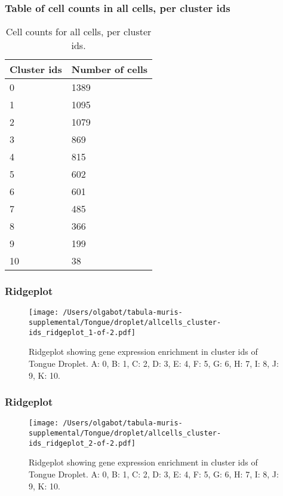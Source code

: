 \subsubsection{Table of cell counts in all cells, per cluster ids}\begin{table}[h]
\centering
\label{my-label}
\begin{tabular}{@{}ll@{}}
\toprule

Cluster ids& Number of cells \\ \midrule
0 & 1389 \\

1 & 1095 \\

2 & 1079 \\

3 & 869 \\

4 & 815 \\

5 & 602 \\

6 & 601 \\

7 & 485 \\

8 & 366 \\

9 & 199 \\

10 & 38 \\
\bottomrule
\end{tabular}
\caption{Cell counts for all cells, per cluster ids.}
\end{table}

\newpage
\subsubsection{Ridgeplot}
\begin{figure}[h]
\centering
\texttt{[image: /Users/olgabot/tabula-muris-supplemental/Tongue/droplet/allcells\_cluster-ids\_ridgeplot\_1-of-2.pdf]}

\caption{ Ridgeplot  showing gene expression enrichment in cluster ids of Tongue Droplet. A: 0, B: 1, C: 2, D: 3, E: 4, F: 5, G: 6, H: 7, I: 8, J: 9, K: 10.}
\end{figure}


\newpage
\newpage
\subsubsection{Ridgeplot}
\begin{figure}[h]
\centering
\texttt{[image: /Users/olgabot/tabula-muris-supplemental/Tongue/droplet/allcells\_cluster-ids\_ridgeplot\_2-of-2.pdf]}

\caption{ Ridgeplot  showing gene expression enrichment in cluster ids of Tongue Droplet. A: 0, B: 1, C: 2, D: 3, E: 4, F: 5, G: 6, H: 7, I: 8, J: 9, K: 10.}
\end{figure}


